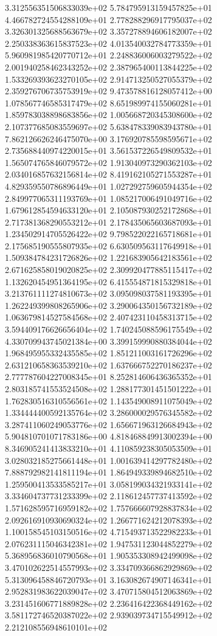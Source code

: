 3.312556351506833039e+02 5.784795913159457825e+01 4.466782724554288109e+01
2.778288296917795037e+02 3.326301325688563679e+02 3.357278894606182007e+02
2.250338363615837523e+02 4.013540032784773359e+01 5.960981985420770712e+01
2.248836006003279522e+02 2.001940258462343252e+02 2.387965400113844225e+02
1.533269393623270105e+02 2.914713250527055379e+02 2.359276706735753919e+02
9.473578816128057412e+00 1.078567746585317479e+02 8.651989974155060281e+01
1.859783038898683856e+02 1.005668720345308600e+02 2.107377685083559697e+02
5.638478339083943780e+01 7.862126626246475070e+00 3.176920785598595671e+02
2.735688440974220015e+01 3.561537226549809532e+01 1.565074765846079572e+02
1.913040973290362103e+02 2.034016857632156814e+02 8.419162105271553287e+01
4.829359550786896449e+01 1.027292759605944354e+02 2.849977065311193769e+01
1.085217006491049716e+02 1.679612854594633120e+01 2.105087930252172868e+01
2.717381368290553212e+01 2.178435065603687093e+01 1.234502914705526422e+02
9.798522022165718681e+01 2.175685190555807935e+02 6.630509563117649918e+01
1.509384784231726826e+02 1.221683905642183561e+02 2.671625858019020825e+02
2.309920477885115417e+02 1.132620454951364195e+02 6.415554871815329818e+01
3.213761111274810673e+02 3.095098037581193395e+01 1.262249399808265906e+02
3.290064350156732189e+02 1.063679814527584568e+02 2.407423110458313715e+02
3.594409176626656404e+02 1.740245088596175549e+02 4.330709943745021384e+00
3.399159990880384044e+02 1.968495955332435585e+02 1.851211003161726296e+02
2.631210658363539210e+02 1.637666752270186237e+02 2.777787604227008345e+01
8.252814606436365352e+01 2.803185741553524508e+02 1.288177301451501222e+01
1.762830516310556561e+02 1.143549008911075049e+02 1.334444400592135764e+02
3.286000029576345582e+02 3.287411060249053776e+02 1.656671963126684943e+02
5.904810701071783186e+00 4.818468849913002394e+00 8.346905241413833210e+01
4.110859238305053509e+01 3.028032185275661448e+01 1.001639414297782480e+02
7.888792982141811194e+01 1.864949339894682510e+02 1.259500413533585217e+01
3.058199034321933141e+02 3.334604737731233399e+02 2.118612457737413592e+02
1.571628595716959182e+02 1.757666607928837834e+02 2.092616910930690324e+02
1.266771624212078393e+02 1.100158545103150516e+02 4.715493713522982233e+01
2.076231115046342381e+02 1.947531123044852279e+02 5.368956836010790568e+01
1.905353308942499098e+02 3.470102622514557993e+02 3.334709366862929869e+02
5.313096458846720793e+01 3.163082674907146341e+01 2.952831983622039047e+02
3.470715804512063869e+02 3.231451606771889828e+02 2.236416422368449162e+02
3.581172746520387022e+02 2.939039734715549912e+02 2.212108556948610101e+02
